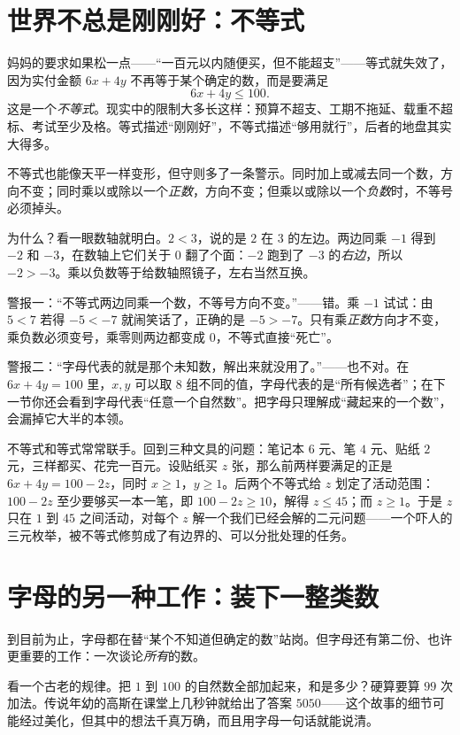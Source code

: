\section{世界不总是刚刚好：不等式}

妈妈的要求如果松一点——“一百元以内随便买，但不能超支”——等式就失效了，因为实付金额 $6x+4y$ 不再等于某个确定的数，而是要满足
\[
6x+4y\leq 100.
\]
这是一个\emph{不等式}。现实中的限制大多长这样：预算不超支、工期不拖延、载重不超标、考试至少及格。等式描述“刚刚好”，不等式描述“够用就行”，后者的地盘其实大得多。

不等式也能像天平一样变形，但守则多了一条警示。同时加上或减去同一个数，方向不变；同时乘以或除以一个\emph{正数}，方向不变；但乘以或除以一个\emph{负数}时，不等号必须掉头。

为什么？看一眼数轴就明白。$2<3$，说的是 $2$ 在 $3$ 的左边。两边同乘 $-1$ 得到 $-2$ 和 $-3$，在数轴上它们关于 $0$ 翻了个面：$-2$ 跑到了 $-3$ 的\emph{右边}，所以 $-2>-3$。乘以负数等于给数轴照镜子，左右当然互换。

\begin{fanli}
警报一：“不等式两边同乘一个数，不等号方向不变。”——错。乘 $-1$ 试试：由 $5<7$ 若得 $-5<-7$ 就闹笑话了，正确的是 $-5>-7$。只有乘\emph{正数}方向才不变，乘负数必须变号，乘零则两边都变成 $0$，不等式直接“死亡”。

警报二：“字母代表的就是那个未知数，解出来就没用了。”——也不对。在 $6x+4y=100$ 里，$x,y$ 可以取 $8$ 组不同的值，字母代表的是“所有候选者”；在下一节你还会看到字母代表“任意一个自然数”。把字母只理解成“藏起来的一个数”，会漏掉它大半的本领。
\end{fanli}

不等式和等式常常联手。回到三种文具的问题：笔记本 $6$ 元、笔 $4$ 元、贴纸 $2$ 元，三样都买、花完一百元。设贴纸买 $z$ 张，那么前两样要满足的正是 $6x+4y=100-2z$，同时 $x\geq1$，$y\geq1$。后两个不等式给 $z$ 划定了活动范围：$100-2z$ 至少要够买一本一笔，即 $100-2z\geq10$，解得 $z\leq45$；而 $z\geq1$。于是 $z$ 只在 $1$ 到 $45$ 之间活动，对每个 $z$ 解一个我们已经会解的二元问题——一个吓人的三元枚举，被不等式修剪成了有边界的、可以分批处理的任务。

\section{字母的另一种工作：装下一整类数}

到目前为止，字母都在替“某个不知道但确定的数”站岗。但字母还有第二份、也许更重要的工作：一次谈论\emph{所有}的数。

看一个古老的规律。把 $1$ 到 $100$ 的自然数全部加起来，和是多少？硬算要算 $99$ 次加法。传说年幼的高斯在课堂上几秒钟就给出了答案 $5050$——这个故事的细节可能经过美化，但其中的想法千真万确，而且用字母一句话就能说清。

